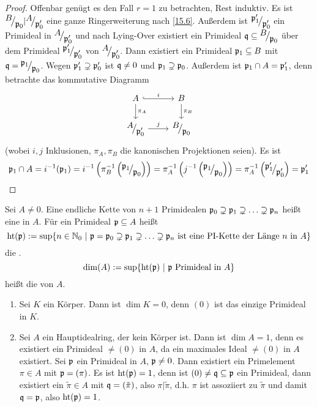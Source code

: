\begin{proof}
	Offenbar genügt es den Fall $r=1$ zu betrachten, Rest induktiv. Es ist $\QR{B}{\p_0}| \QR{A}{\p_0'}$ eine ganze Ringerweiterung nach \ref{15.6}. Außerdem ist $\QR{\p_1'}{\p_0'}$ ein Primideal in $\QR{A}{\p_0'}$ und nach Lying-Over existiert ein Primideal $\q\subseteq \QR{B}{\p_0}$ über dem Primideal $\QR{\p_1'}{\p_0'}$ von $\QR{A}{\p_0'}$. Dann existiert ein Primideal $\mathfrak{p}_1\subseteq B$ mit $\q = \QR{\p_1}{\p_0}$. Wegen $\mathfrak{p}_1' \supsetneq \mathfrak{p}_0'$ ist $\mathfrak{q} \neq 0$ und $\mathfrak{p}_1 \supsetneq \mathfrak{p}_0$. Außerdem ist $\mathfrak{p}_1\cap A = \mathfrak{p}_1'$, denn betrachte das kommutative Diagramm
	$$\begin{tikzcd}
	A \arrow[hook]{r}{i} \arrow{d}{\pi_A} & B \arrow{d}{\pi_B} \\
	\QR{A}{\p_0'} \arrow{r}{j} & \QR{B}{\p_0} 
	\end{tikzcd}$$
	(wobei $i,j$ Inklusionen, $\pi_A, \pi_B$ die kanonischen Projektionen seien). Es ist 
	$$\p_1\cap A = i^{-1}(\p_1) = i^{-1}\left(\pi_B^{-1}\left(\QR{\p_1}{\p_0}\right)\right) = \pi_A^{-1}\left(j^{-1}\left(\QR{\p_1}{\p_0}\right)\right) = \pi_A^{-1}\left(\QR{\p_1'}{\p_0'}\right)= \p_1'$$
\end{proof}
\begin{df}
	Sei $A\neq 0$. Eine endliche Kette von $n+1$ Primidealen $\mathfrak{p}_0\supsetneq \mathfrak{p}_1 \supsetneq \ldots \supsetneq \mathfrak{p}_n$ heißt eine  in $A$. Für ein Primideal $\mathfrak{p}\subseteq A$ heißt 
	$$\text{ht}(\mathfrak{p}):= \sup\{n\in \mathbb{N}_0 \ | \ \mathfrak{p} = \mathfrak{p}_0 \supsetneq \mathfrak{p}_1 \supsetneq \ldots \supsetneq \mathfrak{p}_n \text{ ist eine PI-Kette der Länge } n\text{ in } A\}$$
	die . 
	$$\dim(A) := \sup\{\text{ht}(\mathfrak{p}) \ | \ \mathfrak{p} \text{ Primideal in }A \}$$
	heißt die  von $A$.
\end{df}
\begin{bsp}
	\begin{enumerate}[label = \alph*)]
		\item Sei $K$ ein Körper. Dann ist $\dim K=0$, denn $(0)$ ist das einzige Primideal in $K$.
		\item Sei $A$ ein Hauptidealring, der kein Körper ist. Dann ist $\dim A=1$, denn es existiert ein Primideal $\neq (0)$ in $A$, da ein maximales Ideal $\neq (0)$ in $A$ existiert. Sei $\mathfrak{p}$ ein Primideal in $A$, $\mathfrak{p}\neq 0$. Dann existiert ein Primelement $\pi \in A$ mit $\mathfrak{p} = (\pi)$. Es ist $\text{ht}(\mathfrak{p}) =1$, denn ist $(0) \neq \mathfrak{q} \subseteq \mathfrak{p} $ ein Primideal, dann existiert ein $\tilde{\pi} \in A$ mit $\mathfrak{q}=(\tilde{\pi})$, also $\pi |\tilde{\pi}$, d.h. $\pi$ ist assoziiert zu $\tilde{\pi}$ und damit $\mathfrak{q} = \mathfrak{p}$, also $\text{ht}(\mathfrak{p}) =1$.
	\end{enumerate}
\end{bsp}
